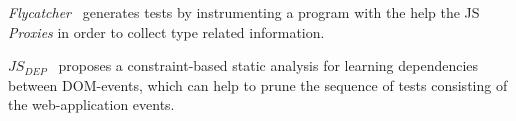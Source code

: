 \emph{Flycatcher}~\cite{de2012automatic} generates tests by instrumenting a program with the help the JS \emph{Proxies} in order to collect type related information.

\emph{$JS_{DEP}$}~\cite{sung2016static} proposes a constraint-based static analysis for learning dependencies between DOM-events, which can help to prune the sequence of tests consisting of the web-application events.

















